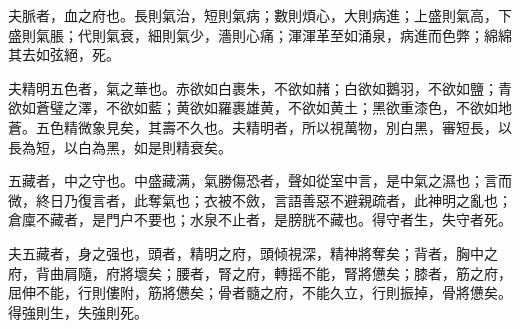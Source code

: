 \documentclass[12pt]{ctexbook}
\begin{document}
\begin{yuanwen}
夫脈者，血之府也。長則氣治，短則氣病；數則煩心，大則病進；上盛則氣高，下盛則氣脹；代則氣衰，細則氣少，濇則心痛；渾渾革至如涌泉，病進而色弊；綿綿其去如弦絕，死。

夫精明五色者，氣之華也。赤欲如白裹朱，不欲如赭；白欲如鵝羽，不欲如鹽；青欲如蒼璧之澤，不欲如藍；黄欲如羅裹雄黄，不欲如黄土；黑欲重漆色，不欲如地蒼。五色精微象見矣，其壽不久也。夫精明者，所以視萬物，別白黑，審短長，以長為短，以白為黑，如是則精衰矣。

五藏者，中之守也。中盛藏满，氣勝傷恐者，聲如從室中言，是中氣之濕也；言而微，終日乃復言者，此奪氣也；衣被不斂，言語善惡不避親疏者，此神明之亂也；倉廩不藏者，是門户不要也；水泉不止者，是膀胱不藏也。得守者生，失守者死。

夫五藏者，身之强也，頭者，精明之府，頭倾視深，精神將奪矣；背者，胸中之府，背曲肩隨，府將壞矣；腰者，腎之府，轉摇不能，腎將憊矣；膝者，筋之府，屈伸不能，行則僂附，筋將憊矣；骨者髓之府，不能久立，行則振掉，骨將憊矣。得強則生，失強則死。
\end{yuanwen}

\end{document}
